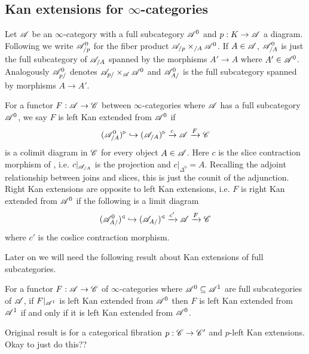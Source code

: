 \documentclass[../../thesis.tex]{subfiles}
\begin{document}
\subsection{Kan extensions for $\infty$-categories}
\begin{definition}
    Let $\mathscr{A}$ be an $\infty$-category with a full subcategory $\mathscr{A}^0$ and $p:K\to \mathscr{A}$ a diagram.
    Following \cite[Notation 4.3.2.1]{HTT} we write $\mathscr{A}^0_{/p}$ for the fiber product $\mathscr{A}_{/p}\times_{/A}\mathscr{A}^0$.
    If $A\in \mathscr{A}$, $\mathscr{A}^0_{/A}$ is just the full subcategory of $\mathscr{A}_{/A}$ spanned by the morphisms $A'\to A$ where $A'\in \mathscr{A}^0$.
    \newline
    Analogously $\mathscr{A}^0_{p/}$ denotes $\mathscr{A}_{p/}\times_{\mathscr{A}}\mathscr{A}^0$ and $\mathscr{A}^0_{A/}$ is the full subcategory spanned by morphisms $A\to A'$.
\end{definition}
\begin{definition}\label{KanDef}
    For a functor $F: \mathscr{A} \to \mathscr{C}$ between $\infty$-categories where $\mathscr{A}$ has a full subcategory $\mathscr{A}^0$, we say $F$ is left Kan extended from $\mathscr{A}^{0}$ if
    \[
        (\mathscr{A}^{0}_{/A})^{\triangleright} \hookrightarrow (\mathscr{A}_{/A})^{\triangleright} \xrightarrow{c} \mathscr{A} \xrightarrow{F}\mathscr{C}
    \]
    is a colimit diagram in $\mathscr{C}$ for every object $A\in \mathscr{A}$.
    Here $c$ is the slice contraction morphism of \cite[\href{https://kerodon.net/tag/0188}{Tag 0188}]{kerodon}, i.e.
    $c|_{\mathscr{A}_{/A}}$ is the projection and $c|_{\Delta^0}=A$.
    Recalling the adjoint relationship between joins and slices, this is just the counit of the adjunction.
    \newline
    Right Kan extensions are opposite to left Kan extensions, i.e. $F$ is right Kan extended from $\mathscr{A}^0$ if the following is a limit diagram
    \[
        (\mathscr{A}^{0}_{A/})^{\triangleleft} \hookrightarrow (\mathscr{A}_{A/})^{\triangleleft} \xrightarrow{c'} \mathscr{A} \xrightarrow{F}\mathscr{C}
    \]
    where $c'$ is the coslice contraction morphism.
\end{definition}
Later on we will need the following result about Kan extensions of full subcategories.
\begin{proposition}\label{4.3.2.8}
    For a functor $F: \mathscr{A}\to\mathscr{C}$ of $\infty$-categories where $\mathscr{A}^0 \subseteq \mathscr{A}^1$ are full subcategories of $\mathscr{A}$, if $F|_{\mathscr{A}^1}$ is left Kan extended from $\mathscr{A}^0$ then $F$ is left Kan extended from $\mathscr{A}^1$ if and only if it is left Kan extended from $\mathscr{A}^0$.
\end{proposition}
\begin{remark}
    Original result is for a categorical fibration $p:\mathscr{C}\to \mathscr{C}'$ and $p$-left Kan extensions. Okay to just do this??
\end{remark}
\end{document}

